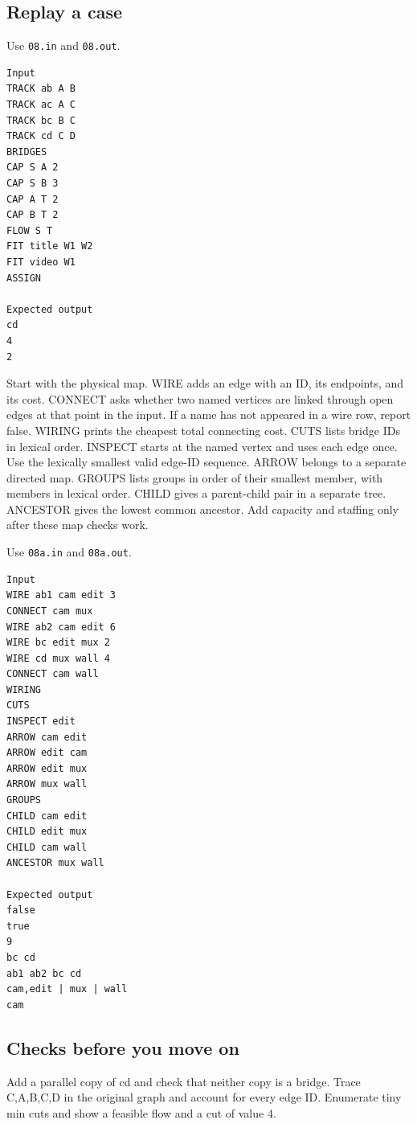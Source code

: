 \documentclass[11pt,letterpaper]{article}
\begin{document}
\subsection*{Replay a case}

Use \texttt{08.in} and \texttt{08.out}.

\begin{samepage}
\small
\begin{verbatim}
Input
TRACK ab A B
TRACK ac A C
TRACK bc B C
TRACK cd C D
BRIDGES
CAP S A 2
CAP S B 3
CAP A T 2
CAP B T 2
FLOW S T
FIT title W1 W2
FIT video W1
ASSIGN

Expected output
cd
4
2
\end{verbatim}
\end{samepage}

Start with the physical map. WIRE adds an edge with an ID, its endpoints, and its cost. CONNECT asks whether two named vertices are linked through open edges at that point in the input. If a name has not appeared in a wire row, report false. WIRING prints the cheapest total connecting cost. CUTS lists bridge IDs in lexical order. INSPECT starts at the named vertex and uses each edge once. Use the lexically smallest valid edge-ID sequence. ARROW belongs to a separate directed map. GROUPS lists groups in order of their smallest member, with members in lexical order. CHILD gives a parent-child pair in a separate tree. ANCESTOR gives the lowest common ancestor. Add capacity and staffing only after these map checks work.

Use \texttt{08a.in} and \texttt{08a.out}.

\begin{samepage}
\small
\begin{verbatim}
Input
WIRE ab1 cam edit 3
CONNECT cam mux
WIRE ab2 cam edit 6
WIRE bc edit mux 2
WIRE cd mux wall 4
CONNECT cam wall
WIRING
CUTS
INSPECT edit
ARROW cam edit
ARROW edit cam
ARROW edit mux
ARROW mux wall
GROUPS
CHILD cam edit
CHILD edit mux
CHILD cam wall
ANCESTOR mux wall

Expected output
false
true
9
bc cd
ab1 ab2 bc cd
cam,edit | mux | wall
cam
\end{verbatim}
\end{samepage}

\subsection*{Checks before you move on}

Add a parallel copy of cd and check that neither copy is a bridge. Trace C,A,B,C,D in the original graph and account for every edge ID. Enumerate tiny min cuts and show a feasible flow and a cut of value 4.
\end{document}
